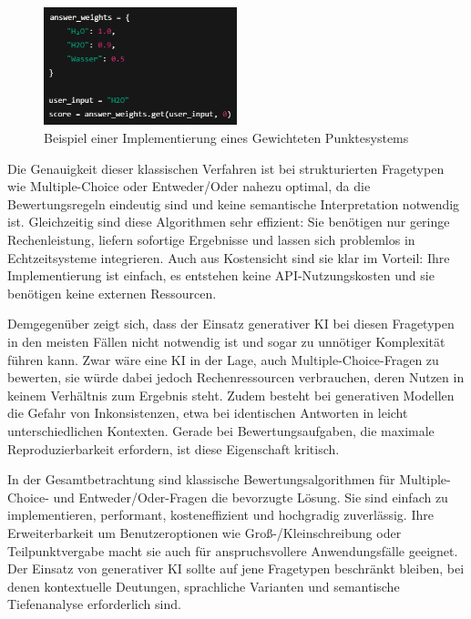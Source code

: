 \documentclass[a4paper,12pt]{article}
\begin{document}
\begin{figure}[H]
    \centering
    \includegraphics[width=0.5\textwidth]{Bilder/GewichtetePunkte}
   \caption{Beispiel einer Implementierung eines Gewichteten Punktesystems}
    \label{fig:transformer}
\end{figure}

Die Genauigkeit dieser klassischen Verfahren ist bei strukturierten Fragetypen wie Multiple-Choice oder Entweder/Oder nahezu optimal, da die Bewertungsregeln eindeutig sind und keine semantische Interpretation notwendig ist. Gleichzeitig sind diese Algorithmen sehr effizient: Sie benötigen nur geringe Rechenleistung, liefern sofortige Ergebnisse und lassen sich problemlos in Echtzeitsysteme integrieren. Auch aus Kostensicht sind sie klar im Vorteil: Ihre Implementierung ist einfach, es entstehen keine API-Nutzungskosten und sie benötigen keine externen Ressourcen.

Demgegenüber zeigt sich, dass der Einsatz generativer KI bei diesen Fragetypen in den meisten Fällen nicht notwendig ist und sogar zu unnötiger Komplexität führen kann. Zwar wäre eine KI in der Lage, auch Multiple-Choice-Fragen zu bewerten, sie würde dabei jedoch Rechenressourcen verbrauchen, deren Nutzen in keinem Verhältnis zum Ergebnis steht. Zudem besteht bei generativen Modellen die Gefahr von Inkonsistenzen, etwa bei identischen Antworten in leicht unterschiedlichen Kontexten. Gerade bei Bewertungsaufgaben, die maximale Reproduzierbarkeit erfordern, ist diese Eigenschaft kritisch.

In der Gesamtbetrachtung sind klassische Bewertungsalgorithmen für Multiple-Choice- und Entweder/Oder-Fragen die bevorzugte Lösung. Sie sind einfach zu implementieren, performant, kosteneffizient und hochgradig zuverlässig. Ihre Erweiterbarkeit um Benutzeroptionen wie Groß-/Kleinschreibung oder Teilpunktvergabe macht sie auch für anspruchsvollere Anwendungsfälle geeignet. Der Einsatz von generativer KI sollte auf jene Fragetypen beschränkt bleiben, bei denen kontextuelle Deutungen, sprachliche Varianten und semantische Tiefenanalyse erforderlich sind.
\end{document}
